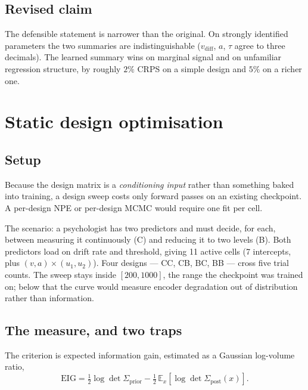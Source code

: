 \documentclass[11pt]{article}
\newcommand{\vdiff}{v_{\mathrm{diff}}}
\begin{document}
\subsection{Revised claim}

The defensible statement is narrower than the original. On strongly identified
parameters the two summaries are indistinguishable ($\vdiff$, $a$, $\tau$ agree to
three decimals). The learned summary wins on marginal signal and on unfamiliar
regression structure, by roughly $2\%$ CRPS on a simple design and $5\%$ on a richer
one.

\section{Static design optimisation}

\subsection{Setup}

Because the design matrix is a \emph{conditioning input} rather than something baked
into training, a design sweep costs only forward passes on an existing checkpoint. A
per-design NPE or per-design MCMC would require one fit per cell.

The scenario: a psychologist has two predictors and must decide, for each, between
measuring it continuously (C) and reducing it to two levels (B). Both predictors load
on drift rate and threshold, giving 11 active cells (7 intercepts, plus
$(v,a)\times(u_1,u_2)$). Four designs --- CC, CB, BC, BB --- cross five trial counts.
The sweep stays inside $[200,1000]$, the range the checkpoint was trained on; below
that the curve would measure encoder degradation out of distribution rather than
information.

\subsection{The measure, and two traps}

The criterion is expected information gain, estimated as a Gaussian log-volume ratio,
\begin{equation}
  \mathrm{EIG} = \tfrac{1}{2}\log\det\Sigma_{\text{prior}}
               - \tfrac{1}{2}\,\mathbb{E}_x\!\left[\log\det\Sigma_{\text{post}}(x)\right].
\end{equation}
\end{document}
